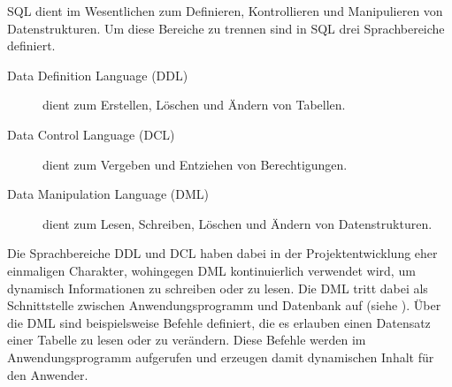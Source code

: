 SQL dient im Wesentlichen zum Definieren, Kontrollieren und Manipulieren von Datenstrukturen. Um diese 
Bereiche zu trennen sind in SQL drei Sprachbereiche definiert.

\begin{description}
  \item[Data Definition Language (DDL)] dient zum Erstellen, Löschen und Ändern von Tabellen.
  \item[Data Control Language (DCL)] dient zum Vergeben und Entziehen von Berechtigungen.
  \item[Data Manipulation Language (DML)] dient zum Lesen, Schreiben, Löschen und Ändern von Datenstrukturen.
\end{description}

Die Sprachbereiche DDL und DCL haben dabei in der Projektentwicklung eher einmaligen Charakter, wohingegen DML 
kontinuierlich verwendet wird, um dynamisch Informationen zu schreiben oder zu lesen. Die DML tritt dabei als 
Schnittstelle zwischen Anwendungsprogramm und Datenbank auf (siehe ). Über die DML sind beispielsweise 
Befehle definiert, die es erlauben einen Datensatz einer Tabelle zu lesen oder zu verändern. Diese Befehle werden im 
Anwendungsprogramm aufgerufen und erzeugen damit dynamischen Inhalt für den Anwender.